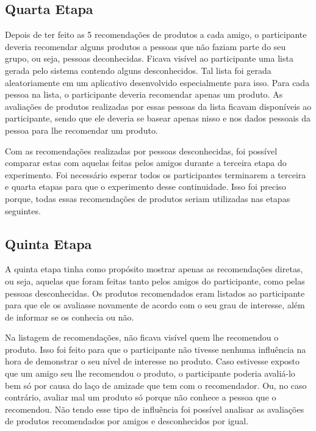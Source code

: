 \subsection{Quarta Etapa}

Depois de ter feito as 5 recomendações de produtos a cada amigo, o participante deveria recomendar alguns produtos a pessoas que não faziam parte do seu grupo, ou seja, pessoas deconhecidas. Ficava visível ao participante uma lista gerada pelo sistema contendo alguns desconhecidos. Tal lista foi gerada aleatoriamente em um aplicativo desenvolvido especialmente para isso. Para cada pessoa na lista, o participante deveria recomendar apenas um produto. As avaliações de produtos realizadas por essas pessoas da lista ficavam disponíveis ao participante, sendo que ele deveria se basear apenas nisso e nos dados pessoais da pessoa para lhe recomendar um produto.


Com as recomendações realizadas por pessoas desconhecidas, foi possível comparar estas com aquelas feitas pelos amigos durante a terceira etapa do experimento. Foi necessário esperar todos os participantes terminarem a terceira e quarta etapas para que o experimento desse continuidade. Isso foi preciso porque, todas essas recomendações de produtos seriam utilizadas nas etapas seguintes.

\subsection{Quinta Etapa}

A quinta etapa tinha como propósito mostrar apenas as recomendações diretas, ou seja, aquelas que foram feitas tanto pelos amigos do participante, como pelas pessoas desconhecidas. Os produtos recomendados eram listados ao participante para que ele os avaliasse novamente de acordo com o seu grau de interesse, além de informar se os conhecia ou não.

Na listagem de recomendações, não ficava visível quem lhe recomendou o produto. Isso foi feito para que o participante não tivesse nenhuma influência na hora de demonstrar o seu nível de interesse no produto. Caso estivesse exposto que um amigo seu lhe recomendou o produto, o participante poderia avaliá-lo bem só por causa do laço de amizade que tem com o recomendador. Ou, no caso contrário, avaliar mal um produto só porque não conhece a pessoa que o recomendou. Não tendo esse tipo de influência foi possível analisar as avaliações de produtos recomendados por amigos e desconhecidos por igual.


